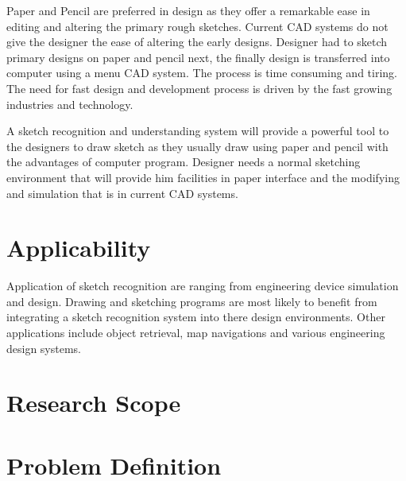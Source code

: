  Paper and Pencil are preferred in design as they offer a remarkable ease in editing and altering the primary rough sketches. Current CAD systems do not give the designer the ease of altering the early designs. Designer had to sketch primary designs on paper and pencil next, the finally design is transferred into computer using a menu CAD system. The process is time consuming and tiring. The need for fast design and development process is driven by the fast growing industries and technology.
 
 A sketch recognition and understanding system will provide a powerful tool to the designers to draw sketch as they usually draw using paper and pencil with the advantages of computer program. Designer needs a normal sketching environment that will provide him facilities in paper interface and the modifying and simulation that is in current CAD systems. 
 
\section{Applicability }
Application of sketch recognition are ranging from engineering device simulation and design. Drawing and sketching programs are most likely to benefit from integrating a sketch recognition system into there design environments. Other applications include object retrieval, map navigations and various engineering design systems.

 
\section{Research Scope}
 



\section{Problem Definition}
\label{sec:ProblemsAndChallenges}


